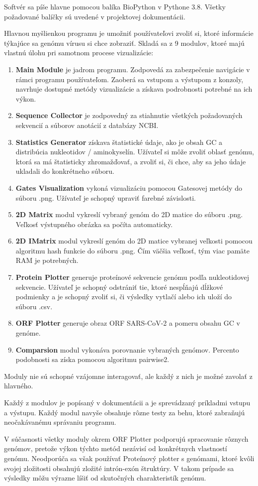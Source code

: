 Softvér sa píše hlavne pomocou balíka BioPython v Pythone 3.8.
Všetky požadované balíčky sú uvedené v projektovej dokumentácii.

Hlavnou myšlienkou programu je umožniť používateľovi zvoliť si, ktoré informácie týkajúce sa genómu vírusu si chce zobraziť.
Skladá sa z 9 modulov, ktoré majú vlastnú úlohu pri samotnom procese vizualizácie:
\begin{enumerate}
    \item \textbf{Main Module} je jadrom programu. Zodpovedá za zabezpečenie navigácie v rámci programu používateľom.
    Zaoberá sa vstupom a výstupom z konzoly, navrhuje dostupné metódy vizualizácie a získava podrobnosti potrebné na ich výkon.
    \item \textbf{Sequence Collector} je zodpovedný za stiahnutie všetkých požadovaných sekvencií a súborov anotácií z databázy NCBI.
    \item \textbf{Statistics Generator} získava štatistické údaje, ako je obsah GC a distribúcia nukleotidov / aminokyselín.
    Užívateľ si môže zvoliť oblasť genómu, ktorá sa má štatisticky zhromažďovať, a zvoliť si, či chce, aby sa jeho údaje ukladali do konkrétneho súboru.
    \item \textbf{Gates Visualization} vykoná vizualizáciu pomocou Gatesovej metódy do súboru .png.
    Užívateľ je schopný upraviť farebné závislosti.
    \item \textbf{2D Matrix} modul vykreslí vybraný genóm do 2D matice do súboru .png. Veľkosť výstupného obrázka sa počíta automaticky.
    \item \textbf{2D IMatrix} modul vykreslí genóm do 2D matice vybranej veľkosti pomocou algoritmu hash funkcie do súboru .png.
    Čím väčšia veľkosť, tým viac pamäte RAM je potrebných.
    \item \textbf{Protein Plotter} generuje proteínové sekvencie genómu podľa nukleotidovej sekvencie.
    Užívateľ je schopný odstrániť tie, ktoré nespĺňajú dĺžkové podmienky a je schopný zvoliť si, či výsledky vytlačí alebo ich uloží do súboru .csv.
    \item \textbf{ORF Plotter} generuje obraz ORF SARS-CoV-2 a pomeru obsahu GC v genóme.
    \item \textbf{Comparsion} modul vykonáva porovnanie vybraných genómov. Percento podobnosti sa získa pomocou algoritmu pairwise2.
\end{enumerate}

Moduly nie sú schopné vzájomne interagovať, ale každý z nich je možné zavolať z hlavného.

Každý z modulov je popísaný v dokumentácii a je sprevádzaný príkladmi vstupu a výstupu.
Každý modul navyše obsahuje rôzne testy za behu, ktoré zabraňujú neočakávanému správaniu programu.

V súčasnosti všetky moduly okrem ORF Plotter podporujú spracovanie rôznych genómov, pretože výkon týchto metód nezávisí od konkrétnych vlastností genómu.
Neodporúča sa však používať Proteínový plotter s genómami, ktoré kvôli svojej zložitosti obsahujú zložité intrón-exón štruktúry.
V takom prípade sa výsledky môžu výrazne líšiť od skutočných charakteristík genómu.